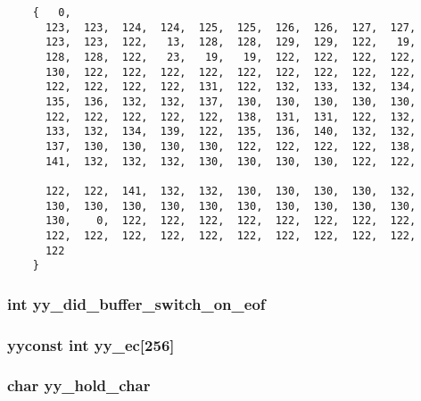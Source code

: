 \footnotesize\begin{verbatim}
    {   0,
      123,  123,  124,  124,  125,  125,  126,  126,  127,  127,
      123,  123,  122,   13,  128,  128,  129,  129,  122,   19,
      128,  128,  122,   23,   19,   19,  122,  122,  122,  122,
      130,  122,  122,  122,  122,  122,  122,  122,  122,  122,
      122,  122,  122,  122,  131,  122,  132,  133,  132,  134,
      135,  136,  132,  132,  137,  130,  130,  130,  130,  130,
      122,  122,  122,  122,  122,  138,  131,  131,  122,  132,
      133,  132,  134,  139,  122,  135,  136,  140,  132,  132,
      137,  130,  130,  130,  130,  122,  122,  122,  122,  138,
      141,  132,  132,  132,  130,  130,  130,  130,  122,  122,

      122,  122,  141,  132,  132,  130,  130,  130,  130,  132,
      130,  130,  130,  130,  130,  130,  130,  130,  130,  130,
      130,    0,  122,  122,  122,  122,  122,  122,  122,  122,
      122,  122,  122,  122,  122,  122,  122,  122,  122,  122,
      122
    }\end{verbatim}\normalsize 
{}
\subsubsection{\setlength{\rightskip}{0pt plus 5cm}int yy\_\-did\_\-buffer\_\-switch\_\-on\_\-eof\hspace{0.3cm}{\tt  [static]}}\label{vcd__lexer_8c_a90}


\subsubsection{\setlength{\rightskip}{0pt plus 5cm}yyconst int yy\_\-ec[256]\hspace{0.3cm}{\tt  [static]}}\label{vcd__lexer_8c_a95}


\subsubsection{\setlength{\rightskip}{0pt plus 5cm}char yy\_\-hold\_\-char\hspace{0.3cm}{\tt  [static]}}\label{vcd__lexer_8c_a85}


